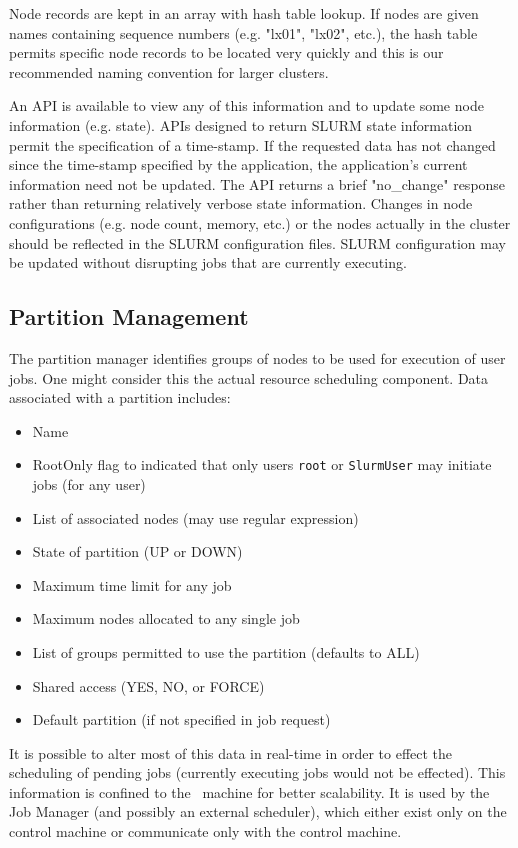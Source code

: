 Node records are kept in an array with hash table lookup. 
If nodes are given names containing sequence numbers (e.g. "lx01", "lx02", 
etc.), the hash table permits specific node records to be located 
very quickly and this is our recommended naming convention for larger 
clusters.

An API is available to view any of this information and to update some 
node information (e.g. state). APIs designed to return SLURM
state information permit the specification of a time-stamp.  If the
requested data has not changed since the time-stamp specified by the
application, the application's current information need not be updated.
The API returns a brief "no\_change" response rather than returning
relatively verbose state information.
Changes in node configurations (e.g. node count, memory, etc.) or the nodes 
actually in the cluster should be reflected in the SLURM configuration 
files. SLURM configuration may be updated without disrupting jobs 
that are currently executing.

\subsection{Partition Management}

The partition manager identifies groups of nodes to be used for
execution of user jobs. One might consider this the actual resource 
scheduling component. 
Data associated with a partition includes:
\begin{itemize}
\item Name
\item RootOnly flag to indicated that only users {\tt root} or 
{\tt SlurmUser} may initiate jobs (for any user)
\item List of associated nodes (may use regular expression)
\item State of partition (UP or DOWN)
\item Maximum time limit for any job
\item Maximum nodes allocated to any single job
\item List of groups permitted to use the partition (defaults to ALL)
\item Shared access (YES, NO, or FORCE)
\item Default partition (if not specified in job request)
\end{itemize}

It is possible to alter most of this data in real-time in order
to effect the scheduling of pending jobs (currently executing jobs
would not be effected).  This information is confined to the \slurmctld\
machine for better scalability.  It is used by the Job Manager
(and possibly an external scheduler), which either exist only on the
control machine or communicate only with the control machine. 

